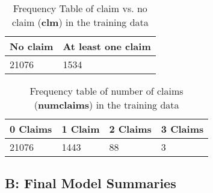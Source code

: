 \documentclass[a4paper]{article}\usepackage[]{graphicx}\usepackage[]{color}
\begin{document}
\begin{table}[h]
\vspace{-10pt}
\begin{center}
\begin{tabular}{|l|l|}
\hline
\textbf{No claim} & \textbf{At least one claim}        \\ \hline
21076        & 1534            \\ \hline
\end{tabular}
\vspace{-5pt}
\caption{Frequency Table of claim vs. no claim (\textbf{clm}) in the training data}
\end{center}
\end{table}

\begin{table}[h]
\vspace{-10pt}
\begin{center}
\begin{tabular}{|l|l|l|l|}
\hline
\textbf{0 Claims} & \textbf{1 Claim} & \textbf{2 Claims} & \textbf{3 Claims}   \\ \hline
21076  & 1443 & 88 & 3   \\ \hline
\end{tabular}
\vspace{-5pt}
\caption{Frequency table of number of claims (\textbf{numclaims}) in the training data}
\end{center}
\end{table}

\subsection*{B: Final Model Summaries}
\end{document}
